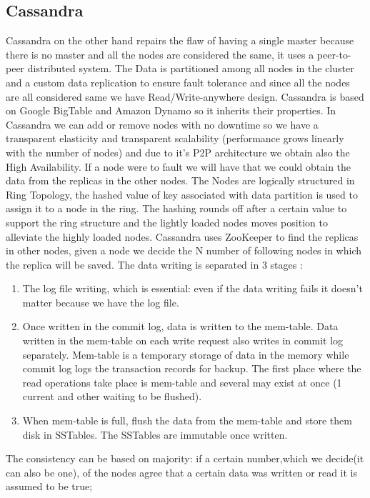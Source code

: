 \documentclass[a4page, 11pt]{article}
\begin{document}
\subsection{Cassandra}
Cassandra on the other hand repairs the flaw of having a single master because there is no master and all the nodes are considered the same, it uses a peer-to-peer distributed system. 
The Data is partitioned among all nodes in the cluster and a custom data replication to ensure fault tolerance and since all the nodes are all considered same we have Read/Write-anywhere design.
Cassandra is based on Google BigTable and Amazon Dynamo so it inherits their properties.
\newline
In Cassandra we can add or remove nodes with no downtime so we have a transparent elasticity and transparent scalability (performance grows linearly with the number of nodes) and due to it's P2P architecture we obtain also the High Availability. If a node were to fault we will have that we could obtain the data from the replicas in the other nodes.
The Nodes are logically structured in Ring Topology, the hashed value of key associated with data partition is used to assign it to a node in the ring. The hashing rounds off after a certain value to support the ring structure and the lightly loaded nodes moves position to alleviate the highly loaded nodes.
Cassandra uses ZooKeeper to find the replicas in other nodes, given a node we decide the N number of following nodes in which the replica will be saved.
\newline
The data writing is separated in 3 stages : 
\begin{enumerate}
	\item The log file writing, which is essential: even if the data writing fails it doesn't matter because we have the log file.
	\item Once written in the commit log, data is written to the mem-table. Data written in the mem-table on each write request also writes in commit log separately. Mem-table is a temporary storage of data in the memory while commit log logs the transaction records for backup.
	\newline The first place where the read operations take place is mem-table and several may exist at once (1 current and other waiting to be flushed). 
	\item When mem-table is full, flush the data from the mem-table and store them disk in SSTables. The SSTables are immutable once written.
\end{enumerate}
The consistency can be based on majority: if a certain number,which we decide(it can also be one), of the nodes agree that a certain data was written or read it is assumed to be true; \newline
\end{document}
